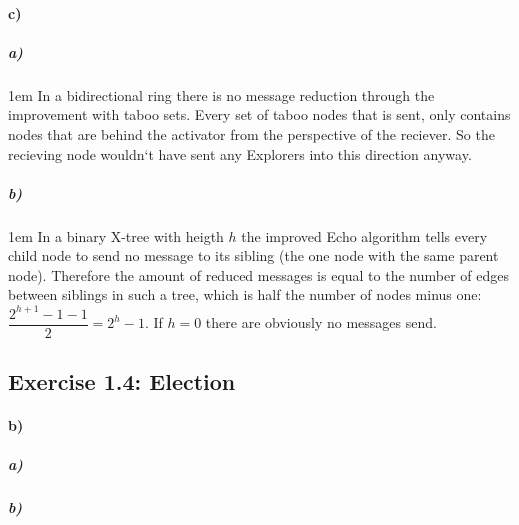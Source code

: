 \documentclass[12pt,a4paper]{article}
\begin{document}
\paragraph{c)}

\subparagraph{a)}
\begingroup
\leftskip1em
In a bidirectional ring there is no message reduction through the improvement with taboo sets. Every set of taboo nodes that is sent, only contains nodes that are behind the activator from the perspective of the reciever. So the recieving node wouldn`t have sent any Explorers into this direction anyway.
\par
\endgroup
\subparagraph{b)}

\begingroup
\leftskip1em
In a binary X-tree with heigth $h$ the improved Echo algorithm tells every child node to send no message to its sibling (the one node with the same parent node). Therefore the amount of reduced messages is equal to the number of edges between siblings in such a tree, which is half the number of nodes minus one: $\dfrac{2^{h+1}-1-1}{2}=2^{h}-1$. If $h=0$ there are obviously no messages send.
\par
\endgroup

\subsection*{Exercise 1.4: Election}
\paragraph{b)} %
\subparagraph{a)} %
\subparagraph{b)} %
\end{document}
